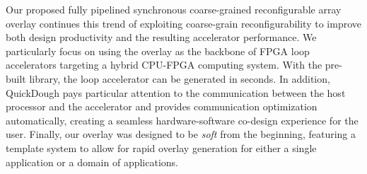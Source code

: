 Our proposed fully pipelined synchronous coarse-grained reconfigurable array overlay continues this
trend of exploiting coarse-grain reconfigurability to improve both design productivity and the
resulting accelerator performance. We particularly focus on using the overlay as the backbone of
FPGA loop accelerators targeting a hybrid CPU-FPGA computing system. With the pre-built library,
the loop accelerator can be generated in seconds. In addition, QuickDough pays particular attention
to the communication between the host processor and the accelerator and provides communication optimization
automatically, creating a seamless hardware-software co-design experience for the user.
Finally, our overlay was designed to be \emph{soft} from the beginning, featuring a template system
to allow for rapid overlay generation for either a single application or a domain of applications. 



